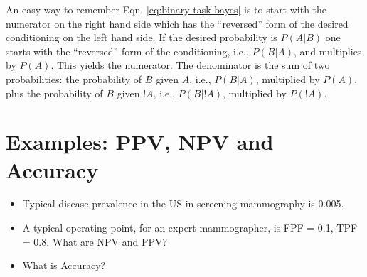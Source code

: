\documentclass[
]{book}
\begin{document}
An easy way to remember Eqn. \eqref{eq:binary-task-bayes} is to start with the numerator on the right hand side which has the ``reversed'' form of the desired conditioning on the left hand side. If the desired probability is \(P(A|B)\) one starts with the ``reversed'' form of the conditioning, i.e., \(P(B|A)\), and multiplies by \(P(A)\). This yields the numerator. The denominator is the sum of two probabilities: the probability of \(B\) given \(A\), i.e., \(P(B|A)\), multiplied by \(P(A)\), plus the probability of \(B\) given \(!A\), i.e., \(P(B|!A)\), multiplied by \(P(!A)\).

\hypertarget{binary-taskNpvPpvCode}{%
\section{Examples: PPV, NPV and Accuracy}\label{binary-taskNpvPpvCode}}

\begin{itemize}
\item
  Typical disease prevalence in the US in screening mammography is 0.005.
\item
  A typical operating point, for an expert mammographer, is FPF = 0.1, TPF = 0.8. What are \(\text{NPV}\) and \(\text{PPV}\)?
\item
  What is Accuracy?
\end{itemize}
\end{document}
